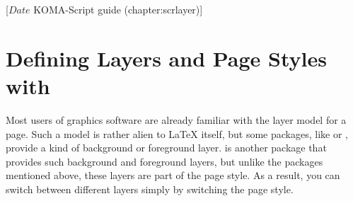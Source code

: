 %
%
%
%
%
%
%
%
% 
%
%
%
%

                 [$Date$
                  KOMA-Script guide (chapter:scrlayer)]



\chapter[{Defining Layers and Page Styles with \Package{scrlayer}}]
  {Defining Layers and Page Styles with
	}

\BeginIndexGroup
{}%
%
Most users of graphics software are already familiar with the layer model for
a page. Such a model is rather alien to \LaTeX{} itself, but some packages,
like  or , provide a kind of
background or foreground layer.  is another package that
provides such background and foreground layers, but unlike the packages
mentioned above, these layers are part of the page style. As a result, you can
switch between different layers simply by switching the page style.

